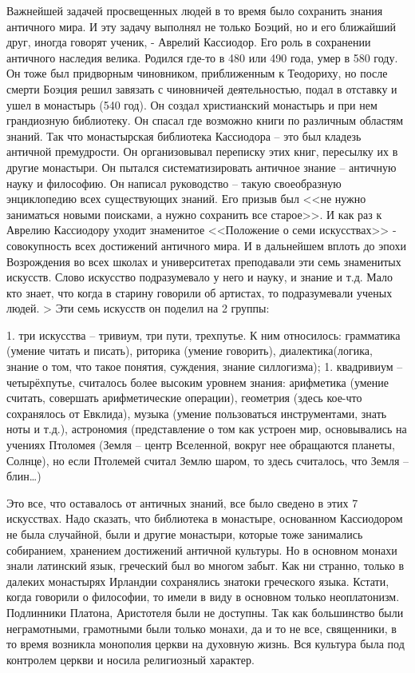 Важнейшей задачей просвещенных людей в то время было сохранить знания античного мира. И эту задачу выполнял не только Боэций, но и его ближайший друг, иногда говорят ученик, - Аврелий Кассиодор. Его роль в сохранении античного наследия велика. Родился где-то в 480 или 490 года, умер в 580 году. Он тоже был придворным чиновником, приближенным к Теодориху, но после смерти Боэция решил завязать с чиновничей деятельностью, подал в отставку и ушел в монастырь (540 год). Он создал христианский монастырь и при нем грандиозную библиотеку. Он спасал где возможно книги по различным областям знаний. Так что монастырская библиотека Кассиодора – это был кладезь античной премудрости. Он организовывал переписку этих книг, пересылку их в другие монастыри. Он пытался систематизировать античное знание – античную науку и философию. Он написал руководство – такую своеобразную энциклопедию всех существующих знаний. Его призыв был <<не нужно заниматься новыми поисками, а нужно сохранить все старое>>. И как раз к Аврелию Кассиодору уходит знаменитое <<Положение о семи искусствах>> - совокупность всех достижений античного мира. И в дальнейшем вплоть до эпохи Возрождения во всех школах и университетах преподавали эти семь знаменитых искусств. Слово искусство подразумевало у него и науку, и знание и т.д. Мало кто знает, что когда в старину говорили об артистах, то подразумевали ученых людей. > Эти семь искусств он поделил на 2 группы:

    1. три искусства – тривиум, три пути, трехпутье. К ним относилось: грамматика (умение читать и писать), риторика (умение говорить), диалектика(логика, знание о том, что такое понятия, суждения, знание силлогизма); 1. квадривиум – четырёхпутье, считалось более высоким уровнем знания: арифметика (умение считать, совершать арифметические операции), геометрия (здесь кое-что сохранялось от Евклида), музыка (умение пользоваться инструментами, знать ноты и т.д.), астрономия (представление о том как устроен мир, основывались на учениях Птоломея (Земля – центр Вселенной, вокруг нее обращаются планеты, Солнце), но если Птолемей считал Землю шаром, то здесь считалось, что Земля – блин…)

Это все, что оставалось от античных знаний, все было сведено в этих 7 искусствах. Надо сказать, что библиотека в монастыре, основанном Кассиодором не была случайной, были и другие монастыри, которые тоже занимались собиранием, хранением достижений античной культуры. Но в основном монахи знали латинский язык, греческий был во многом забыт. Как ни странно, только в далеких монастырях Ирландии сохранялись знатоки греческого языка. Кстати, когда говорили о философии, то имели в виду в основном только неоплатонизм. Подлинники Платона, Аристотеля были не доступны. Так как большинство были неграмотными, грамотными были только монахи, да и то не все, священники, в то время возникла монополия церкви на духовную жизнь. Вся культура была под контролем церкви и носила религиозный характер.

